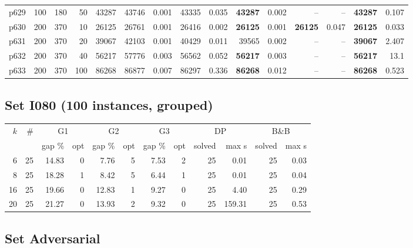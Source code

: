 \begin{longtable}{@{}lrrrr@{\hspace{9pt}}rr@{\hspace{9pt}}rr@{\hspace{9pt}}rr@{\hspace{9pt}}rr@{\hspace{9pt}}rr@{}}
p629 & 100 & 180 & 50 & 43287 & 43746 & 0.001 & 43335 & 0.035 & \textbf{43287} & 0.002 & -- & -- & \textbf{43287} & 0.107\\
p630 & 200 & 370 & 10 & 26125 & 26761 & 0.001 & 26416 & 0.002 & \textbf{26125} & 0.001 & \textbf{26125} & 0.047 & \textbf{26125} & 0.033\\
p631 & 200 & 370 & 20 & 39067 & 42103 & 0.001 & 40429 & 0.011 & 39565 & 0.002 & -- & -- & \textbf{39067} & 2.407\\
p632 & 200 & 370 & 40 & 56217 & 57776 & 0.003 & 56562 & 0.052 & \textbf{56217} & 0.003 & -- & -- & \textbf{56217} & 13.1\\
p633 & 200 & 370 & 100 & 86268 & 86877 & 0.007 & 86297 & 0.336 & \textbf{86268} & 0.012 & -- & -- & \textbf{86268} & 0.523\\
\bottomrule\end{longtable}\endgroup
{}\subsection*{Set I080 (100 instances, grouped)}
\begin{center}\footnotesize\setlength{\tabcolsep}{5pt}\begin{tabular}{@{}rrrrrrrrrrrr@{}}\toprule
\(k\) & \# & \multicolumn{2}{c}{G1} & \multicolumn{2}{c}{G2} & \multicolumn{2}{c}{G3} & \multicolumn{2}{c}{DP} & \multicolumn{2}{c}{B\&B}\\
 & & gap \% & opt & gap \% & opt & gap \% & opt & solved & max s & solved & max s\\\midrule
6 & 25 & 14.83 & 0 & 7.76 & 5 & 7.53 & 2 & 25 & 0.01 & 25 & 0.03\\
8 & 25 & 18.28 & 1 & 8.42 & 5 & 6.44 & 1 & 25 & 0.01 & 25 & 0.04\\
16 & 25 & 19.66 & 0 & 12.83 & 1 & 9.27 & 0 & 25 & 4.40 & 25 & 0.29\\
20 & 25 & 21.27 & 0 & 13.93 & 2 & 9.32 & 0 & 25 & 159.31 & 25 & 0.53\\
\bottomrule\end{tabular}\end{center}
\subsection*{Set Adversarial}
\begingroup\footnotesize\setlength{\tabcolsep}{2.6pt}\setlength{\LTpre}{2pt}
